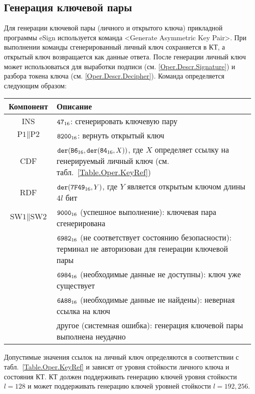\subsection{Генерация ключевой пары}\label{Oper.Descr.GenKeys}

Для генерации ключевой пары (личного и открытого ключа) прикладной программы eSign
используется команда <Generate Asymmetric Key Pair>. При выполнении команды 
сгенерированный личный ключ сохраняется в КТ,
а открытый ключ возвращается как данные ответа.
После генерации личный ключ может использоваться 
для выработки подписи (см. \ref{Oper.Descr.Signature}) и
разбора токена ключа (см. \ref{Oper.Descr.Decipher}).
Команда определяется следующим образом:

\noindent
\begin{tabular}{|c|p{14cm}|}
\hline
Компонент & Описание\\
\hline
\hline
INS & $\texttt{47}_{16}$: сгенерировать ключевую пару \\
\hline
$\text{P1} \parallel\text{P2}$ & $\texttt{8200}_{16}$:
вернуть открытый ключ \\
\hline
CDF & $\texttt{der}(\texttt{B6}_{16},\texttt{der}(\texttt{84}_{16}, X))$,
где $X$ определяет ссылку на генерируемый личный ключ
(см. табл.~\ref{Table.Oper.KeyRef}) \\
\hline \hline
RDF & $\texttt{der}(\texttt{7F49}_{16}, Y)$, где $Y$ является открытым ключом длины $4l$ бит\\
\hline
$\text{SW1} \parallel \text{SW2}$ & 
$\texttt{9000}_{16}$ (успешное выполнение): ключевая пара сгенерирована\\
 & $\texttt{6982}_{16}$ (не соответствует состоянию безопасности): терминал не 
авторизован для генерации ключевой пары\\
 & $\texttt{6984}_{16}$ (необходимые данные не доступны): ключ уже существует\\
 & $\texttt{6A88}_{16}$ (необходимые данные не найдены): неверная ссылка на ключ\\
 & другое (системная ошибка): генерация ключевой пары выполнена неудачно\\
\hline
\end{tabular}

Допустимые значения ссылок на личный ключ определяются
в соответствии с табл.~\ref{Table.Oper.KeyRef} и зависят от
уровня стойкости личного ключа и состояния КТ.
КТ должен поддерживать генерацию ключей уровня стойкости 
$l=128$ и может поддерживать генерацию ключей 
уровней стойкости $l=192, 256$.

